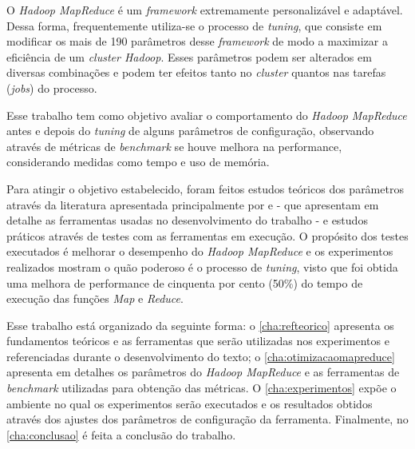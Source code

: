 O \textit{Hadoop MapReduce} é um \textit{\gls{framework}} extremamente personalizável e adaptável. Dessa forma, frequentemente utiliza-se o processo de \textit{\gls{tuning}}, que consiste em modificar os mais de 190 parâmetros desse \textit{\gls{framework}} de modo a maximizar a eficiência de um \textit{cluster Hadoop}. Esses parâmetros podem ser alterados em diversas combinações e podem ter efeitos tanto no \textit{cluster} quantos nas tarefas (\textit{jobs}) do processo.

Esse trabalho tem como objetivo avaliar o comportamento do \textit{Hadoop MapReduce} antes e depois do \textit{\gls{tuning}} de alguns parâmetros de configuração, observando através de métricas de \textit{\gls{benchmark}} se houve melhora na performance, considerando medidas como tempo e uso de memória.

Para atingir o objetivo estabelecido, foram feitos estudos teóricos dos parâmetros através da literatura apresentada principalmente por \textcite{HadoopBook15} e \textcite{ProHadoop09} - que apresentam em detalhe as ferramentas usadas no desenvolvimento do trabalho - e estudos práticos através de testes com as ferramentas em execução. O propósito dos testes executados é melhorar o desempenho do \textit{Hadoop MapReduce} e os experimentos realizados mostram o quão poderoso é o processo de \textit{\gls{tuning}}, visto que foi obtida uma melhora de performance de cinquenta por cento (50\%) do tempo de execução das funções \textit{Map} e \textit{Reduce}.

Esse trabalho está organizado da seguinte forma: o \autoref{cha:refteorico} apresenta os fundamentos teóricos e as ferramentas que serão utilizadas nos experimentos e referenciadas durante o desenvolvimento do texto; o \autoref{cha:otimizacaomapreduce} apresenta em detalhes os parâmetros do \textit{Hadoop MapReduce} e as ferramentas de \textit{\gls{benchmark}} utilizadas para obtenção das métricas. O \autoref{cha:experimentos} expõe o ambiente no qual os experimentos serão executados e os resultados obtidos através dos ajustes dos parâmetros de configuração da ferramenta. Finalmente, no \autoref{cha:conclusao} é feita a conclusão do trabalho.